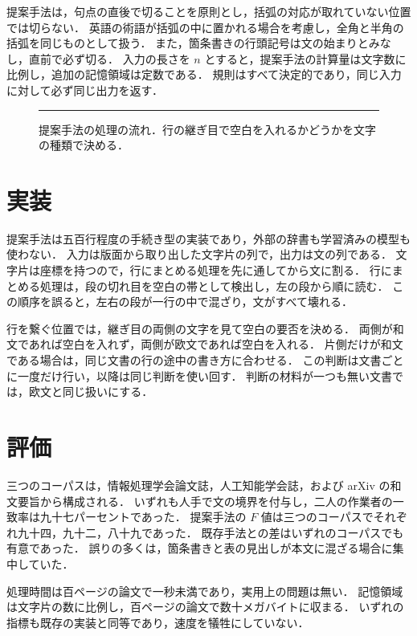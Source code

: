 \documentclass[11pt,a4paper]{article}
\newcommand{\s}[1]{#1}
\begin{document}
\s{提案手法は，句点の直後で切ることを原則とし，括弧の対応が取れていない位置では切らない．}%
\s{英語の術語が括弧の中に置かれる場合を考慮し，全角と半角の括弧を同じものとして扱う．}%
\s{また，箇条書きの行頭記号は文の始まりとみなし，直前で必ず切る．}%
\s{入力の長さを $n$ とすると，提案手法の計算量は文字数に比例し，追加の記憶領域は定数である．}%
\s{規則はすべて決定的であり，同じ入力に対して必ず同じ出力を返す．}%

\begin{figure}[t]
  \centering
  \rule{6cm}{2.4cm}
  \caption{提案手法の処理の流れ．行の継ぎ目で空白を入れるかどうかを文字の種類で決める．}
\end{figure}

\section{実装}

\s{提案手法は五百行程度の手続き型の実装であり，外部の辞書も学習済みの模型も使わない．}%
\s{入力は版面から取り出した文字片の列で，出力は文の列である．}%
\s{文字片は座標を持つので，行にまとめる処理を先に通してから文に割る．}%
\s{行にまとめる処理は，段の切れ目を空白の帯として検出し，左の段から順に読む．}%
\s{この順序を誤ると，左右の段が一行の中で混ざり，文がすべて壊れる．}%

\s{行を繋ぐ位置では，継ぎ目の両側の文字を見て空白の要否を決める．}%
\s{両側が和文であれば空白を入れず，両側が欧文であれば空白を入れる．}%
\s{片側だけが和文である場合は，同じ文書の行の途中の書き方に合わせる．}%
\s{この判断は文書ごとに一度だけ行い，以降は同じ判断を使い回す．}%
\s{判断の材料が一つも無い文書では，欧文と同じ扱いにする．}%

\section{評価}

\s{三つのコーパスは，情報処理学会論文誌，人工知能学会誌，および arXiv の和文要旨から構成される．}%
\s{いずれも人手で文の境界を付与し，二人の作業者の一致率は九十七パーセントであった．}%
\s{提案手法の $F$ 値は三つのコーパスでそれぞれ九十四，九十二，八十九であった．}%
\s{既存手法との差はいずれのコーパスでも有意であった．}%
\s{誤りの多くは，箇条書きと表の見出しが本文に混ざる場合に集中していた．}%

\s{処理時間は百ページの論文で一秒未満であり，実用上の問題は無い．}%
\s{記憶領域は文字片の数に比例し，百ページの論文で数十メガバイトに収まる．}%
\s{いずれの指標も既存の実装と同等であり，速度を犠牲にしていない．}%
\end{document}
